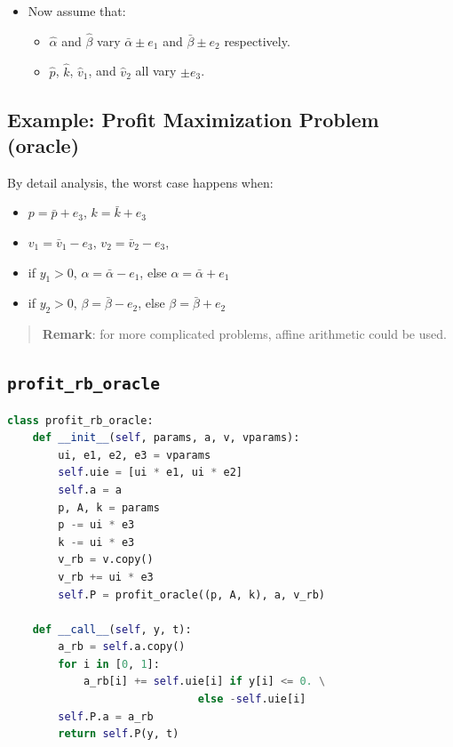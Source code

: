 \documentclass[]{article}
\providecommand{\tightlist}{%
  \setlength{\itemsep}{0pt}\setlength{\parskip}{0pt}}
\begin{document}
\begin{itemize}
\tightlist
\item
  Now assume that:

  \begin{itemize}
  \tightlist
  \item
    \(\hat{\alpha}\) and \(\hat{\beta}\) vary \(\bar{\alpha} \pm e_1\)
    and \(\bar{\beta} \pm e_2\) respectively.
  \item
    \(\hat{p}\), \(\hat{k}\), \(\hat{v}_1\), and \(\hat{v}_2\) all vary
    \(\pm e_3\).
  \end{itemize}
\end{itemize}

\hypertarget{example-profit-maximization-problem-oracle}{%
\subsection{Example: Profit Maximization Problem
(oracle)}\label{example-profit-maximization-problem-oracle}}

By detail analysis, the worst case happens when:

\begin{itemize}
\tightlist
\item
  \(p = \bar{p} + e_3\), \(k = \bar{k} + e_3\)
\item
  \(v_1 = \bar{v}_1 - e_3\), \(v_2 = \bar{v}_2 - e_3\),
\item
  if \(y_1 > 0\), \(\alpha = \bar{\alpha} - e_1\), else
  \(\alpha = \bar{\alpha} + e_1\)
\item
  if \(y_2 > 0\), \(\beta = \bar{\beta} - e_2\), else
  \(\beta = \bar{\beta} + e_2\)
\end{itemize}

\begin{quote}
\textbf{Remark}: for more complicated problems, affine arithmetic could
be used.
\end{quote}

\hypertarget{profit_rb_oracle}{%
\subsection{\texorpdfstring{\texttt{profit\_rb\_oracle}}{profit\_rb\_oracle}}\label{profit_rb_oracle}}

\begin{lstlisting}[language=Python]
class profit_rb_oracle:
    def __init__(self, params, a, v, vparams):
        ui, e1, e2, e3 = vparams
        self.uie = [ui * e1, ui * e2]
        self.a = a
        p, A, k = params
        p -= ui * e3
        k -= ui * e3
        v_rb = v.copy()
        v_rb += ui * e3
        self.P = profit_oracle((p, A, k), a, v_rb)

    def __call__(self, y, t):
        a_rb = self.a.copy()
        for i in [0, 1]:
            a_rb[i] += self.uie[i] if y[i] <= 0. \
                              else -self.uie[i]
        self.P.a = a_rb
        return self.P(y, t)
\end{lstlisting}
\end{document}
